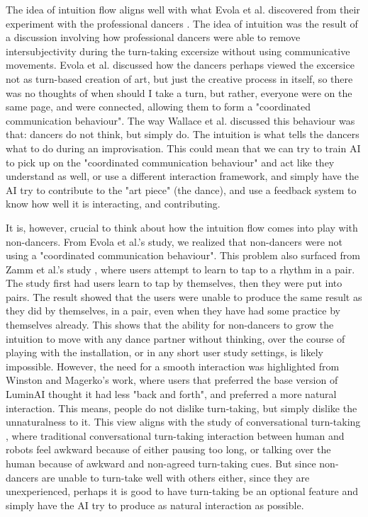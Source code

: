 \documentclass[final,5p,times,twocolumn,authoryear]{article}
\begin{document}
The idea of intuition flow aligns well with what Evola et al. discovered
from their experiment with the professional dancers \cite{Wallace2023,
Evola}. The idea of intuition was the result of a discussion involving
how professional dancers were able to remove intersubjectivity during
the turn-taking excersize without using communicative movements. Evola
et al. discussed how the dancers perhaps viewed the excersice not as
turn-based creation of art, but just the creative process in itself, so
there was no thoughts of when should I take a turn, but rather, everyone
were on the same page, and were connected, allowing them to form a
"coordinated communication behaviour". The way Wallace et al. discussed
this behaviour was that: dancers do not think, but simply do. The
intuition is what tells the dancers what to do during an improvisation.
This could mean that we can try to train AI to pick up on the
"coordinated communication behaviour" and act like they understand as
well, or use a different interaction framework, and simply have the AI
try to contribute to the "art piece" (the dance), and use a feedback
system to know how well it is interacting, and contributing.

It is, however, crucial to think about how the intuition flow comes into
play with non-dancers. From Evola et al.'s study, we realized that
non-dancers were not using a "coordinated communication behaviour". This
problem also surfaced from Zamm et al.'s study \cite{Zamm2023}, where
users attempt to learn to tap to a rhythm in a pair. The study first had
users learn to tap by themselves, then they were put into pairs. The
result showed that the users were unable to produce the same result as
they did by themselves, in a pair, even when they have had some practice
by themselves already. This shows that the ability for non-dancers to
grow the intuition to move with any dance partner without thinking, over
the course of playing with the installation, or in any short user study
settings, is likely impossible. However, the need for a smooth
interaction was highlighted from Winston and Magerko's work, where users
that preferred the base version of LuminAI thought it had less "back and
forth", and preferred a more natural interaction. This means, people do
not dislike turn-taking, but simply dislike the unnaturalness to it.
This view aligns with the study of conversational turn-taking
\cite{Thomaz2011}, where traditional conversational turn-taking
interaction between human and robots feel awkward because of either
pausing too long, or talking over the human because of awkward and
non-agreed turn-taking cues. But since non-dancers are unable to
turn-take well with others either, since they are unexperienced, perhaps
it is good to have turn-taking be an optional feature and simply have
the AI try to produce as natural interaction as possible.
\end{document}
